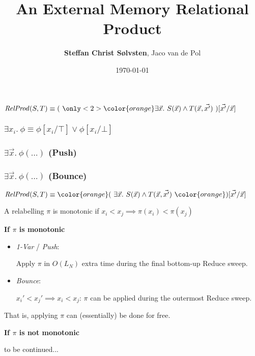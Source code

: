 \documentclass[english, aspectratio=169]{beamer}
\title{An External Memory Relational Product}
\author{\textbf{Steffan Christ S\o lvsten}, Jaco van de Pol}
\institute{\texttt{[image: external/aulogo\_uk\_var2\_black.eps]}}
\date{\today}
\begin{document}
\titleframe

\begin{frame}
  \begin{center}
    \LARGE

    $\mathit{RelProd}(S,T)
    \equiv
    (
    \ {\only<2>{\color{orange}} \exists \vec{x} .}\
    S(\vec{x}) \wedge T(\vec{x}, \vec{x'})
    \ ) [\vec{x'} / \vec{x}]$
  \end{center}
\end{frame}

\begin{frame}
  \frametitle{$\exists x_i .\ \phi \equiv \phi[x_i / \top] \vee \phi[x_i / \bot]$}

  
\end{frame}

\blankframe

\begin{frame}
  \frametitle{$\exists \vec{x}.\ \phi(\dots)$ \quad (Push)}

  
\end{frame}

\blankframe

\begin{frame}
  \frametitle{$\exists \vec{x}.\ \phi(\dots)$ \quad (Bounce)}

  
\end{frame}

\blankframe

\begin{frame}
  \begin{center}
    \LARGE

    $\mathit{RelProd}(S,T)
    \equiv
    {\color{orange} (}
    \ \exists \vec{x} .\
    S(\vec{x}) \wedge T(\vec{x}, \vec{x'})
    \ {\color{orange} ) [\vec{x'} / \vec{x}]}$
  \end{center}
\end{frame}

\begin{frame}
  \begin{definition}
    A relabelling $\pi$ is monotonic if $x_i < x_j \implies \pi(x_i) < \pi(x_j)$
  \end{definition}

  \pause
  {\bf If $\pi$ is monotonic}

  \begin{itemize}
  \item \emph{1-Var} / \emph{Push}:

    Apply $\pi$ in $O(L_N)$ extra time during the final bottom-up Reduce
    sweep.

  \item \emph{Bounce}:

    $x_i' < x_j' \implies x_i < x_j$: $\pi$ can be applied during the
    outermost Reduce sweep.
  \end{itemize}

  \quad That is, applying $\pi$ can (essentially) be done for free.

  \pause
  {\bf If $\pi$ is not monotonic}

  \quad to be continued...
\end{frame}
\end{document}
